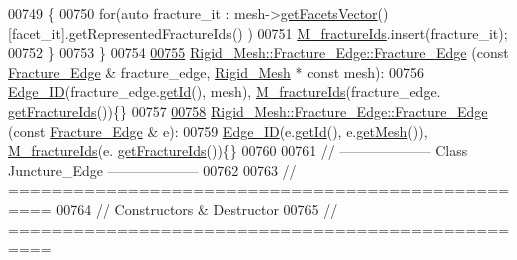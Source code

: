 \begin{DoxyCode}
00749     \{
00750         \textcolor{keywordflow}{for}(\textcolor{keyword}{auto} fracture\_it : mesh->\hyperlink{classFVCode3D_1_1Rigid__Mesh_a6d3cdd4ef8a5225599953179d5302636}{getFacetsVector}()[facet\_it].getRepresentedFractureIds()
      )
00751             \hyperlink{classFVCode3D_1_1Rigid__Mesh_1_1Fracture__Edge_a1a498306a94e881c238467af5c99cb57}{M\_fractureIds}.insert(fracture\_it);
00752     \}
00753 \}
00754 
\hypertarget{RigidMesh_8cpp_source.tex_l00755}{}\hyperlink{classFVCode3D_1_1Rigid__Mesh_1_1Fracture__Edge_a011ab1f44d95fae370f49ab2e561f0c6}{00755} \hyperlink{classFVCode3D_1_1Rigid__Mesh_1_1Fracture__Edge_a9b7b4e922c35eb8e83bc3209b4a668f2}{Rigid\_Mesh::Fracture\_Edge::Fracture\_Edge} (\textcolor{keyword}{const} 
      \hyperlink{classFVCode3D_1_1Rigid__Mesh_1_1Fracture__Edge}{Fracture\_Edge} & fracture\_edge, \hyperlink{classFVCode3D_1_1Rigid__Mesh}{Rigid\_Mesh} * \textcolor{keyword}{const} mesh):
00756     \hyperlink{classFVCode3D_1_1Rigid__Mesh_1_1Edge__ID}{Edge\_ID}(fracture\_edge.\hyperlink{classFVCode3D_1_1Rigid__Mesh_1_1Edge__ID_af17ee26739dd0bb462a21a90c2c1e633}{getId}(), mesh), \hyperlink{classFVCode3D_1_1Rigid__Mesh_1_1Fracture__Edge_a1a498306a94e881c238467af5c99cb57}{M\_fractureIds}(fracture\_edge.
      \hyperlink{classFVCode3D_1_1Rigid__Mesh_1_1Fracture__Edge_af9ba908f4ca3fe7c68a3892252ea51b8}{getFractureIds}())\{\}
00757 
\hypertarget{RigidMesh_8cpp_source.tex_l00758}{}\hyperlink{classFVCode3D_1_1Rigid__Mesh_1_1Fracture__Edge_a9e674edb76a432728a81061ac946825b}{00758} \hyperlink{classFVCode3D_1_1Rigid__Mesh_1_1Fracture__Edge_a9b7b4e922c35eb8e83bc3209b4a668f2}{Rigid\_Mesh::Fracture\_Edge::Fracture\_Edge} (\textcolor{keyword}{const} 
      \hyperlink{classFVCode3D_1_1Rigid__Mesh_1_1Fracture__Edge}{Fracture\_Edge} & e):
00759     \hyperlink{classFVCode3D_1_1Rigid__Mesh_1_1Edge__ID}{Edge\_ID}(e.\hyperlink{classFVCode3D_1_1Rigid__Mesh_1_1Edge__ID_af17ee26739dd0bb462a21a90c2c1e633}{getId}(), e.\hyperlink{classFVCode3D_1_1Rigid__Mesh_1_1Edge__ID_a197a8049cfb5e26c077f668ffb49e6eb}{getMesh}()), \hyperlink{classFVCode3D_1_1Rigid__Mesh_1_1Fracture__Edge_a1a498306a94e881c238467af5c99cb57}{M\_fractureIds}(e.
      \hyperlink{classFVCode3D_1_1Rigid__Mesh_1_1Fracture__Edge_af9ba908f4ca3fe7c68a3892252ea51b8}{getFractureIds}())\{\}
00760 
00761 \textcolor{comment}{// --------------------   Class Juncture\_Edge   --------------------}
00762 
00763 \textcolor{comment}{// ==================================================}
00764 \textcolor{comment}{// Constructors & Destructor}
00765 \textcolor{comment}{// ==================================================}

\end{DoxyCode}
